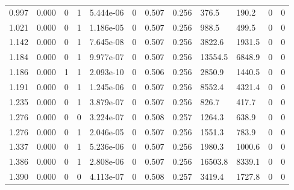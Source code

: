 \documentclass[preview]{standalone}
\begin{document}
{{\begin{tabular}{L{1.2cm}C{1.2cm} C{0.3cm}C{0.5cm} C{1.4cm}C{1.4cm} C{1.4cm}C{1.4cm} C{1.6cm}C{1.6cm} C{1.6cm}C{1.6cm}}
  0.997  &  0.000  & 0     &  1 &  5.444e-06  & 0  &  0.507&   0.256& 376.5 & 190.2   &  0 & 0  \\ 
  1.021  &  0.000  & 0     &  1 &  1.186e-05  & 0  &  0.507&   0.256& 988.5 & 499.5   &  0 & 0  \\ 
  1.142  &  0.000  & 0     &  1 &  7.645e-08  & 0  &  0.507&   0.256& 3822.6 & 1931.5   &  0 & 0  \\ 
  1.184  &  0.000  & 0     &  1 &  9.977e-07  & 0  &  0.507&   0.256& 13554.5 & 6848.9   &  0 & 0  \\ 
  1.186  &  0.000  & 1     &  1 &  2.093e-10  & 0  &  0.506&   0.256& 2850.9 & 1440.5   &  0 & 0  \\ 
  1.191  &  0.000  & 0     &  1 &  1.245e-06  & 0  &  0.507&   0.256& 8552.4 & 4321.4   &  0 & 0  \\ 
  1.235  &  0.000  & 0     &  1 &  3.879e-07  & 0  &  0.507&   0.256& 826.7 & 417.7   &  0 & 0  \\ 
  1.276  &  0.000  & 0     &  0 &  3.224e-07  & 0  &  0.508&   0.257& 1264.3 & 638.9   &  0 & 0  \\ 
  1.276  &  0.000  & 0     &  1 &  2.046e-05  & 0  &  0.507&   0.256& 1551.3 & 783.9   &  0 & 0  \\ 
  1.337  &  0.000  & 0     &  1 &  5.236e-06  & 0  &  0.507&   0.256& 1980.3 & 1000.6   &  0 & 0  \\ 
  1.386  &  0.000  & 0     &  1 &  2.808e-06  & 0  &  0.507&   0.256& 16503.8 & 8339.1   &  0 & 0  \\ 
  1.390  &  0.000  & 0     &  0 &  4.113e-07  & 0  &  0.508&   0.257& 3419.4 & 1727.8   &  0 & 0  \\ 
\hline 
\end{tabular} 

}}
\end{document}
